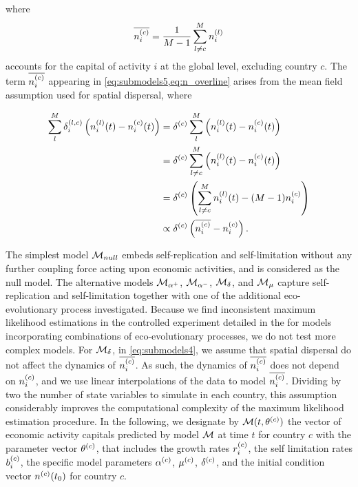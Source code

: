 where 
\begin{equation}\label{eq:n_overline}
      \overline{n_i^{(c)} } = \frac{1}{M-1} \sum_{l \neq c}^M n_{i}^{(l)}
\end{equation}
accounts for the capital of activity $i$ at the global level, excluding country $c$. The term $\overline{n_i^{(c)} }$ appearing in \cref{eq:submodels5,eq:n_overline} arises from the mean field assumption used for spatial dispersal, where 

\begin{equation}
  \begin{split}
    \sum_l^M \delta^{(l,c)}_{i} \left( n_i^{(l)}(t) - n_i^{(c)}(t)  \right) &= \delta^{(c)}  \sum_l^M  \left(n_i^{(l)}(t) - n_i^{(c)}(t) \right) \\
    &= \delta^{(c)} \sum_{l \neq c}^M \left(n_i^{(l)}(t) - n_i^{(c)}(t) \right) \\
    &= \delta^{(c)} \left( \sum_{l \neq c}^M n_i^{(l)}(t) - (M - 1) n_i^{(c)} \right) \\
    &\propto \delta^{(c)} \left( \overline{n_i^{(c)} } - n_i^{(c)} \right).
  \end{split}
\end{equation}

The simplest model $\mathcal{M}_{null}$ embeds self-replication and self-limitation without any further coupling force acting upon economic activities, and is considered as the null model.
% 
The alternative models $\mathcal{M}_{\alpha^+}$, $\mathcal{M}_{\alpha^-}$, $\mathcal{M}_\delta$, and $\mathcal{M}_\mu$ capture self-replication and self-limitation together with one of the additional eco-evolutionary process investigated.
% 
Because we find inconsistent maximum likelihood estimations in the controlled experiment detailed in the  for models incorporating combinations of eco-evolutionary processes, we do not test more complex models.
% 
For $\mathcal{M}_\delta$, in \cref{eq:submodels4}, we assume that spatial dispersal do not affect the dynamics of $\overline{n_i^{(c)}}$. As such, the dynamics of $\overline{n_i^{(c)}}$ does not depend on $n_i^{(c)}$, and we use linear interpolations of the data to model $\overline{n_i^{(c)}}$. Dividing by two the number of state variables to simulate in each country, this assumption considerably improves the computational complexity of the maximum likelihood estimation procedure.
% 
In the following, we designate by $\mathcal{M}(t,\theta^{(c)} )$ the vector of economic activity capitals predicted by model $\mathcal{M}$ at time $t$ for country $c$ with the parameter vector $\theta^{(c)}$, that includes the growth rates $r_i^{(c)} $, the self limitation rates $b_i^{(c)}$, the specific model parameters $\alpha^{(c)}$, $\mu^{(c)}$, $\delta^{(c)}$, and the initial condition vector $n^{(c)} (t_0)$ for country $c$.


